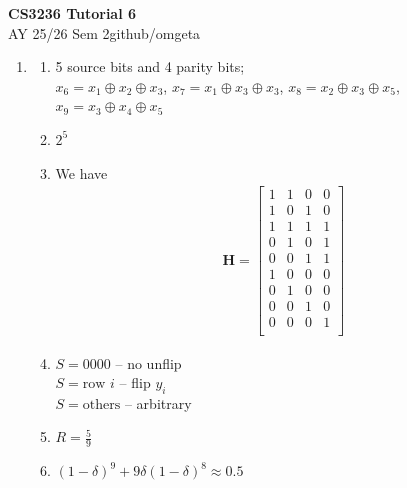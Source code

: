 \documentclass[12pt, a4paper]{article}
\newcommand{\mytitle}{CS3236 Tutorial 6}
\newcommand{\myauthor}{github/omgeta}
\newcommand{\mydate}{AY 25/26 Sem 2}
\begin{document}
\raggedright
\footnotesize
\begin{center}
{\normalsize{\textbf{\mytitle}}} \\
{\footnotesize{\mydate\hspace{2pt}\textemdash\hspace{2pt}\myauthor}}
\end{center}
\begin{enumerate}
  \item 
    \begin{enumerate}
      \item 5 source bits and 4 parity bits;\\ 
        $x_6 = x_1 \oplus x_2 \oplus x_3$, $x_7 = x_1 \oplus x_3 \oplus x_3$, $x_8 = x_2 \oplus x_3 \oplus x_5$, $x_9 = x_3 \oplus x_4 \oplus x_5$

      \item $2^5$

      \item We have
        \begin{align*}
          \mathbf{H} = \begin{bmatrix}
            1 & 1 & 0 & 0\\
            1 & 0 & 1 & 0\\
            1 & 1 & 1 & 1\\
            0 & 1 & 0 & 1\\
            0 & 0 & 1 & 1\\
            1 & 0 & 0 & 0\\
            0 & 1 & 0 & 0\\
            0 & 0 & 1 & 0\\
            0 & 0 & 0 & 1\\
          \end{bmatrix}
        \end{align*}

      \item $S=0000$ -- no unflip\\ 
        $S = \text{row }i$ -- flip $y_i$\\ 
        $S = \text{others}$ -- arbitrary

      \item $R = \frac{5}{9}$

      \item $(1-\delta)^9 + 9\delta(1-\delta)^8 \approx 0.5$
    \end{enumerate}


\end{enumerate}
\end{document}
